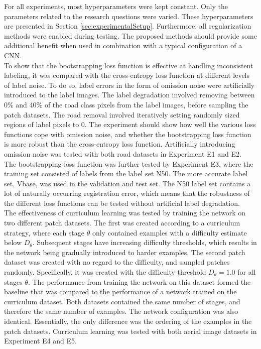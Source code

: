 For all experiments, most hyperparameters were kept constant. Only the parameters related to the research questions were varied. These hyperparameters are presented in Section \ref{sec:experimentalSetup}. Furthermore, all regularization methods were enabled during testing. The proposed methods should provide some additional benefit when used in combination with a typical configuration of a \ac{CNN}.\\

To show that the bootstrapping loss function is effective at handling inconsistent labeling, it was compared with the cross-entropy loss function at different levels of label noise. To do so, label errors in the form of omission noise were artificially introduced to the label images. The label degradation involved removing between 0\% and 40\% of the road class pixels from the label images, before sampling the patch datasets. The road removal involved iteratively setting randomly sized regions of label pixels to 0. The experiment should show how well the various loss functions cope with omission noise, and whether the bootstrapping loss function is more robust than the cross-entropy loss function. Artificially introducing omission noise was tested with both road datasets in Experiment E1 and E2.\\

The bootstrapping loss function was further tested by Experiment E3, where the training set consisted of labels from the label set N50. The more accurate label set, Vbase, was used in the validation and test set. The N50 label set contains a lot of naturally occurring registration error, which means that the robustness of the different loss functions can be tested without artificial label degradation.\\

The effectiveness of curriculum learning was tested by training the network on two different patch datasets. The first was created according to a curriculum strategy, where each stage $\theta$ only contained examples with a difficulty estimate below $D_\theta$. Subsequent stages have increasing difficulty thresholds, which results in the network being gradually introduced to harder examples. The second patch dataset was created with no regard to the difficulty, and sampled patches randomly. Specifically, it was created with the difficulty threshold $D_\theta =1.0$ for all stages $\theta$. The performance from training the network on this dataset formed the baseline that was compared to the performance of a network trained on the curriculum dataset. Both datasets contained the same number of stages, and therefore the same number of examples. The network configuration was also identical. Essentially, the only difference was the ordering of the examples in the patch datasets. Curriculum learning was tested with both aerial image datasets in Experiment E4 and E5.\\

